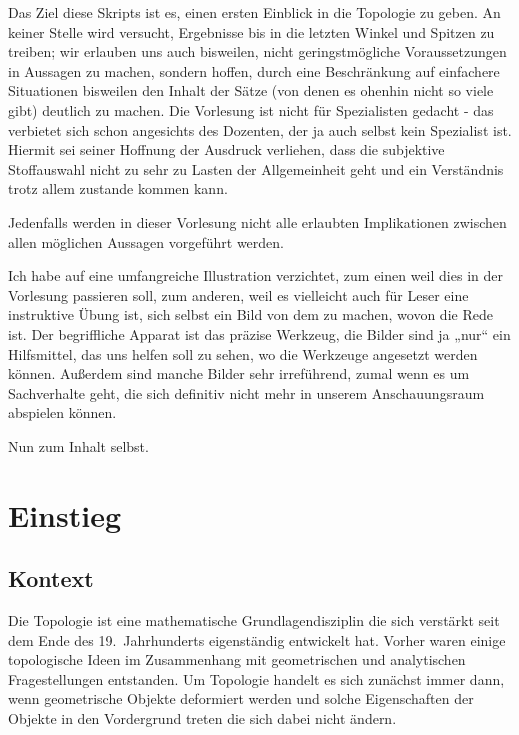 \documentclass[12pt]{book}   %
\begin{document}
Das Ziel diese Skripts ist es, einen ersten Einblick in die Topologie zu geben.
An keiner Stelle wird versucht, Ergebnisse bis in die letzten Winkel und 
Spitzen zu treiben; wir erlauben uns auch bisweilen, nicht geringstmögliche 
Voraussetzungen in Aussagen zu machen, sondern hoffen, durch eine 
Beschränkung auf einfachere Situationen bisweilen den Inhalt der Sätze
(von denen es ohenhin nicht so viele gibt) deutlich zu machen. Die Vorlesung
ist nicht für Spezialisten gedacht - das verbietet sich schon angesichts des
Dozenten, der ja auch selbst kein Spezialist ist. Hiermit sei seiner Hoffnung 
der Ausdruck verliehen, dass die subjektive Stoffauswahl nicht zu sehr zu 
Lasten der Allgemeinheit geht und ein Verständnis trotz allem zustande
kommen kann.

Jedenfalls werden in dieser Vorlesung nicht alle erlaubten Implikationen 
zwischen allen möglichen Aussagen vorgeführt werden. 

Ich habe auf eine umfangreiche Illustration verzichtet, zum einen weil dies in 
der Vorlesung passieren soll, zum 
anderen, weil es vielleicht auch für Leser eine instruktive Übung ist, sich
selbst ein Bild von dem zu machen, wovon die Rede ist. Der begriffliche 
Apparat ist das präzise Werkzeug, die Bilder sind ja „nur“ ein 
Hilfsmittel, das uns helfen soll zu sehen, wo die Werkzeuge angesetzt werden 
können. Außerdem sind manche Bilder sehr irreführend, zumal wenn es um
Sachverhalte geht, die sich definitiv nicht mehr in unserem Anschauungsraum
abspielen können.



\bigskip

Nun zum Inhalt selbst.

\chapter{Einstieg}

\section{Kontext}




Die Topologie ist eine mathematische Grundlagendisziplin die sich verstärkt
seit dem Ende des 19.\ Jahrhunderts eigenständig entwickelt hat. Vorher waren
einige topologische Ideen im Zusammenhang mit geometrischen und analytischen 
Fragestellungen entstanden. Um Topologie handelt es sich zunächst immer dann,
wenn geometrische Objekte deformiert werden und solche Eigenschaften der 
Objekte in den Vordergrund treten die sich dabei nicht ändern. 
\end{document}
